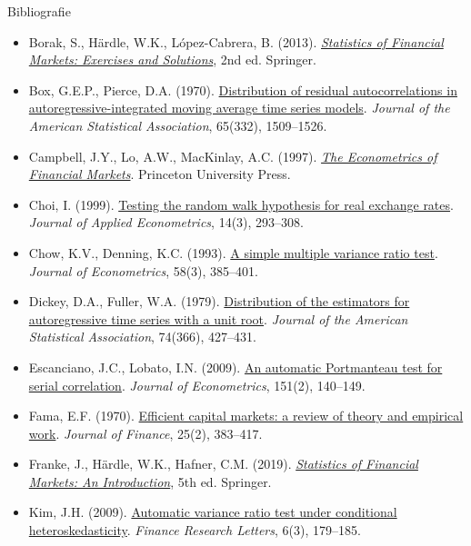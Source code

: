 \begin{frame}{Bibliografie}
\itemsize{\tiny}
\begin{itemize}
    \item Borak, S., Härdle, W.K., López-Cabrera, B. (2013). \href{https://doi.org/10.1007/978-3-642-33929-5}{\textit{Statistics of Financial Markets: Exercises and Solutions}}, 2nd ed. Springer.
    \item Box, G.E.P., Pierce, D.A. (1970). \href{https://doi.org/10.1080/01621459.1970.10481180}{Distribution of residual autocorrelations in autoregressive-integrated moving average time series models}. \textit{Journal of the American Statistical Association}, 65(332), 1509--1526.
    \item Campbell, J.Y., Lo, A.W., MacKinlay, A.C. (1997). \href{https://doi.org/10.1515/9781400830213}{\textit{The Econometrics of Financial Markets}}. Princeton University Press.
    \item Choi, I. (1999). \href{https://doi.org/10.1002/(SICI)1099-1255(199905/06)14:3<293::AID-JAE503>3.0.CO;2-5}{Testing the random walk hypothesis for real exchange rates}. \textit{Journal of Applied Econometrics}, 14(3), 293--308.
    \item Chow, K.V., Denning, K.C. (1993). \href{https://doi.org/10.1016/0304-4076(93)90051-6}{A simple multiple variance ratio test}. \textit{Journal of Econometrics}, 58(3), 385--401.
    \item Dickey, D.A., Fuller, W.A. (1979). \href{https://doi.org/10.1080/01621459.1979.10482531}{Distribution of the estimators for autoregressive time series with a unit root}. \textit{Journal of the American Statistical Association}, 74(366), 427--431.
    \item Escanciano, J.C., Lobato, I.N. (2009). \href{https://doi.org/10.1016/j.jeconom.2009.03.001}{An automatic Portmanteau test for serial correlation}. \textit{Journal of Econometrics}, 151(2), 140--149.
    \item Fama, E.F. (1970). \href{https://doi.org/10.1111/j.1540-6261.1970.tb00518.x}{Efficient capital markets: a review of theory and empirical work}. \textit{Journal of Finance}, 25(2), 383--417.
    \item Franke, J., Härdle, W.K., Hafner, C.M. (2019). \href{https://doi.org/10.1007/978-3-030-13751-9}{\textit{Statistics of Financial Markets: An Introduction}}, 5th ed. Springer.
    \item Kim, J.H. (2009). \href{https://doi.org/10.1016/j.frl.2009.04.003}{Automatic variance ratio test under conditional heteroskedasticity}. \textit{Finance Research Letters}, 6(3), 179--185.

\end{itemize}
\end{frame}
